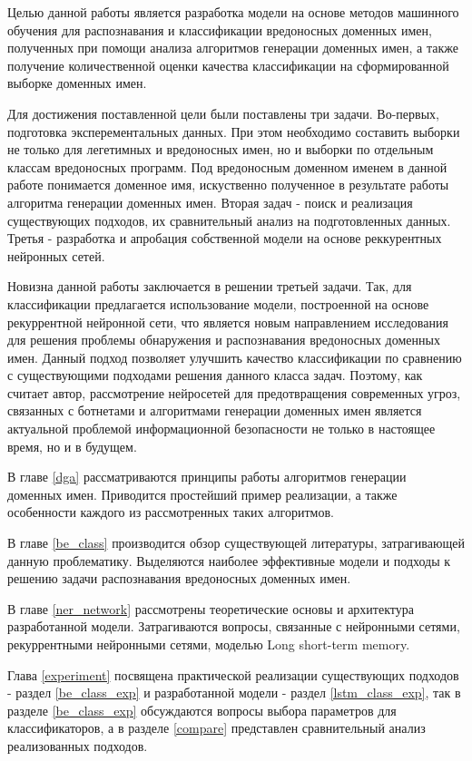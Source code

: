 Целью данной работы является разработка модели на основе методов машинного обучения для распознавания и классификации вредоносных доменных имен, полученных при помощи анализа алгоритмов генерации доменных имен, а также получение количественной оценки качества классификации на сформированной выборке доменных имен.

Для достижения поставленной цели были поставлены три задачи. Во-первых, подготовка эксперементальных данных. При этом необходимо составить выборки не только для легетимных и вредоносных имен, но и выборки по отдельным классам вредоносных программ. Под вредоносным доменном именем в данной работе понимается доменное имя, искуственно полученное в результате работы алгоритма генерации доменных имен. Вторая задач - поиск и реализация существующих подходов, их сравнительный анализ на подготовленных данных. Третья - разработка и апробация собственной модели на основе реккурентных нейронных сетей.

Новизна данной работы заключается в решении третьей задачи. Так, для классификации предлагается использование модели, построенной на основе рекуррентной нейронной сети, что является новым направлением исследования для решения проблемы обнаружения и распознавания вредоносных доменных имен. Данный подход позволяет улучшить качество классификации по сравнению с существующими подходами решения данного класса задач. Поэтому, как считает автор, рассмотрение нейросетей для предотвращения современных угроз, связанных с ботнетами и алгоритмами генерации доменных имен является актуальной проблемой информационной безопасности не только в настоящее время, но и в будущем.

В главе \ref{dga} рассматриваются принципы работы алгоритмов генерации доменных имен. Приводится простейший пример реализации, а также особенности каждого из рассмотренных таких алгоритмов.

В главе \ref{be_class} производится обзор существующей литературы, затрагивающей данную проблематику. Выделяются наиболее эффективные модели и подходы к решению задачи распознавания вредоносных доменных имен.

В главе \ref{ner_network} рассмотрены теоретические основы и архитектура разработанной модели. Затрагиваются вопросы, связанные с нейронными сетями, рекуррентными нейронными сетями, моделью Long short-term memory.

Глава \ref{experiment} посвящена практической реализации существующих подходов - раздел \ref{be_class_exp} и разработанной модели - раздел \ref{lstm_class_exp}, так в разделе \ref{be_class_exp} обсуждаются вопросы выбора параметров для классификаторов, а в разделе \ref{compare} представлен сравнительный анализ реализованных подходов.
\clearpage